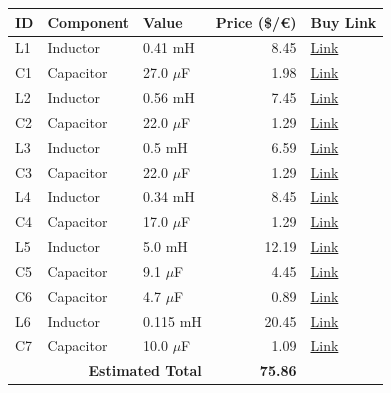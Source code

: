 \documentclass[11pt,a4paper]{report}
\begin{document}
\vspace{0.5cm}
\begin{table}[H]
    \centering
    \renewcommand{\arraystretch}{1.5}
    \begin{tabular}{@{}lllrl@{}}
        \toprule
        \textbf{ID} & \textbf{Component} & \textbf{Value} & \textbf{Price (\$/€)} & \textbf{Buy Link} \\
        \midrule
        L1 & Inductor & 0.41 mH & 8.45 & \href{https://www.soundimports.eu/en/jantzen-audio-000-1303.html}{Link} \\
        C1 & Capacitor & 27.0 $\mu$F & 1.98 & \href{https://www.soundimports.eu/en/jantzen-audio-001-6150.html}{Link} \\
        L2 & Inductor & 0.56 mH & 7.45 & \href{https://www.soundimports.eu/en/jantzen-audio-000-2377.html}{Link} \\
        C2 & Capacitor & 22.0 $\mu$F & 1.29 & \href{https://www.parts-express.com/22uF-100V-Non-Polarized-Capacitor-027-348}{Link} \\
        L3 & Inductor & 0.5 mH & 6.59 & \href{https://www.parts-express.com/Dayton-Audio-LW18-50-0.50mH-18-AWG-Perfect-Layer-Inductor-257-816}{Link} \\
        C3 & Capacitor & 22.0 $\mu$F & 1.29 & \href{https://www.parts-express.com/22uF-100V-Non-Polarized-Capacitor-027-348}{Link} \\
        L4 & Inductor & 0.34 mH & 8.45 & \href{https://www.soundimports.eu/en/jantzen-audio-000-0832.html}{Link} \\
        C4 & Capacitor & 17.0 $\mu$F & 1.29 & \href{https://www.parts-express.com/17uF-100V-Non-Polarized-Capacitor-027-346}{Link} \\
        L5 & Inductor & 5.0 mH & 12.19 & \href{https://www.parts-express.com/Dayton-Audio-IC185-5.0mH-18-AWG-Laminated-Iron-Core-Inductor-257-668}{Link} \\
        C5 & Capacitor & 9.1 $\mu$F & 4.45 & \href{https://www.soundimports.eu/en/jantzen-audio-001-0263.html}{Link} \\
        C6 & Capacitor & 4.7 $\mu$F & 0.89 & \href{https://www.parts-express.com/4.7uF-100V-Non-Polarized-Capacitor-027-332}{Link} \\
        L6 & Inductor & 0.115 mH & 20.45 & \href{https://www.soundimports.eu/en/jantzen-audio-000-7623.html}{Link} \\
        C7 & Capacitor & 10.0 $\mu$F & 1.09 & \href{https://www.parts-express.com/10uF-100V-Non-Polarized-Capacitor-027-340}{Link} \\
        \midrule
        \multicolumn{3}{r}{\textbf{Estimated Total}} & \textbf{75.86} & \\
        \bottomrule
    \end{tabular}
\end{table}
\end{document}
